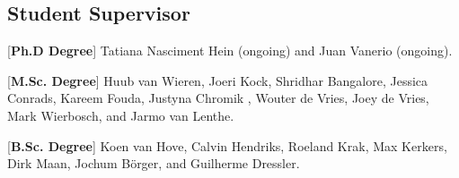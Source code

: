 \documentclass[print]{styles/friggeri-cv-linux} %
\begin{document}
\subsection{Student Supervisor}\vspace{-5pt}


\begin{entrylist}
\vspace{-0.3cm}
\entry
{[\textbf{Ph.D Degree}]}
{\textnormal{Tatiana Nasciment Hein (ongoing) and Juan Vanerio (ongoing).}}
{}

\entry
{[\textbf{M.Sc. Degree}]}
{\textnormal{Huub van Wieren, Joeri Kock, Shridhar Bangalore, Jessica Conrads, Kareem Fouda, Justyna Chromik , Wouter de Vries, Joey de Vries, Mark Wierbosch, and Jarmo van Lenthe.}}
{}

\vspace{-0.3cm}
\entry
{[\textbf{B.Sc. Degree}]}
{\textnormal{Koen van Hove, Calvin Hendriks, Roeland Krak, Max Kerkers, Dirk Maan, Jochum Börger, and Guilherme Dressler.}} 
{}

\end{entrylist}


\end{document}
